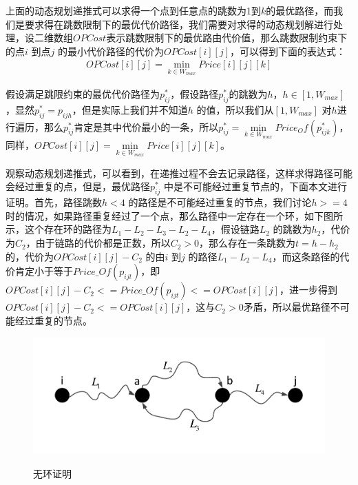 上面的动态规划递推式可以求得一个点到任意点的跳数为1到$k$的最优路径，而我们是要求得在跳数限制下的最优代价路径，我们需要对求得的动态规划解进行处理，设二维数组$OPCost$表示跳数限制下的最优路由代价值，那么跳数限制约束下的点$i$ 到点$j$ 的最小代价路径的代价为$OPCost[i][j]$，可以得到下面的表达式：
\begin{equation}\label{best}
\begin{split}
OPCost[i][j]=\min\limits_{k \in W_{max}}{Price[i][j][k]}
\end{split}
\end{equation}

假设满足跳限约束的最优代价路径为$p_{ij}^*$，假设路径$p_{ij}^*$的跳数为$h$，$h \in [1,W_{max}]$，显然$p_{ij}^*=p_{ijh}$，但是实际上我们并不知道$h$ 的值，所以我们从$[1,W_{max}]$ 对$h$进行遍历，那么$p_{ij}^*$肯定是其中代价最小的一条，所以$p_{ij}^*=\min\limits_{k \in W_{max}}{Price_Of(p_{ijk}^*)}$，同样，$OPCost[i][j]=\min\limits_{k \in W_{max}}{Price[i][j][k]}$。

观察动态规划递推式，可以看到，在递推过程不会去记录路径，这样求得路径可能会经过重复的点，但是，最优路径$p_{ij}^*$ 中是不可能经过重复节点的，下面本文进行证明。首先，路径跳数$h<4$ 的路径是不可能经过重复的节点，我们讨论$h>=4$ 时的情况，如果路径重复经过了一个点，那么路径中一定存在一个环，如下图所示，这个存在环的路径为$L_1-L_2-L_3-L_2-L_4$，假设链路$L_2$ 的跳数为$h_2$，代价为$C_2$，由于链路的代价都是正数，所以$C_2>0$，那么存在一条跳数为$t=h-h_2$ 的，代价为$OPCost[i][j]-C_2$ 的由$i$ 到$j$ 的路径$L_1-L_2-L_4$，而这条路径的代价肯定小于等于$Price\_Of(p_{ijt})$，即$OPCost[i][j]-C_2<=Price\_Of(p_{ijt})<=OPCost[i][j]$，进一步得到$OPCost[i][j]-C_2<=OPCost[i][j]$，这与$C_2>0$矛盾，所以最优路径不可能经过重复的节点。
 \begin{figure}
\setlength{\belowcaptionskip}{-0.5cm}
  \begin{center}
    {\includegraphics[width=1 \textwidth]{figures/circle.pdf}}
    \end{center}
  \caption{{\footnotesize{无环证明}}}
  \label{prof}
\end{figure}
